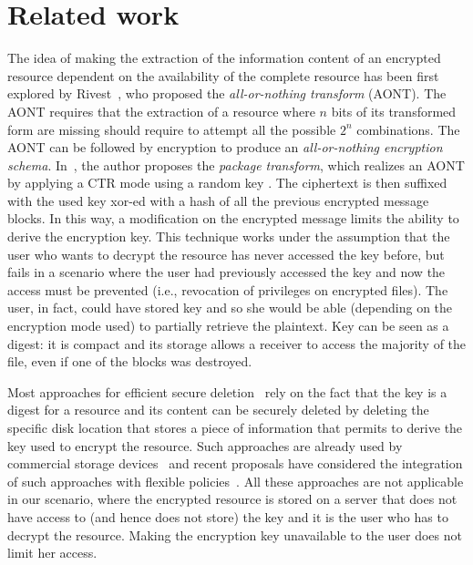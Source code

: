 \section{Related work}\label{ms:sec:relwork}

The idea of making the extraction of the information content of an encrypted resource dependent on the availability of the complete resource has been first explored by Rivest~\cite{r97}, who proposed the {\em all-or-nothing transform} (AONT). The AONT requires that the extraction of a resource where $n$ bits of its transformed form are missing should require to attempt all the possible $2^n$ combinations. The AONT can be followed by encryption to produce an {\em all-or-nothing encryption schema}. In~\cite{r97}, the author proposes the {\em package transform}, which realizes an AONT by applying a CTR mode using a random key \key{}. The ciphertext is then suffixed with the used key \key{} {\sc xor}-ed with a hash of all the previous encrypted message blocks. In this way, a modification on the encrypted message limits the ability to derive the encryption key. This technique works under the assumption that the user who wants to decrypt the resource has never accessed the key before, but fails in a scenario where the user had previously accessed the key and now the access must be prevented (i.e., revocation of privileges on encrypted files). The user, in fact, could have stored key \key{} and so she would be able (depending on the encryption mode used) to partially retrieve the plaintext. Key \key{} can be seen as a digest: it is compact and its storage allows a receiver to access the majority of the file, even if one of the blocks was destroyed.

Most approaches for efficient secure deletion~\cite{chhs13,dw10} rely on the fact that the key is a digest for a resource and its content can be securely deleted by deleting the specific disk location that stores a piece of information that permits to derive the key used to encrypt the resource. Such approaches are already used by commercial storage devices~\cite{standardInd} and recent proposals have considered the integration of such approaches with flexible policies~\cite{chhs13}. All these approaches are not applicable in our scenario, where the encrypted resource is stored on a server that does not have access to (and hence does not store) the key and it is the user who has to decrypt the resource. Making the encryption key unavailable to the user does not limit her access.


